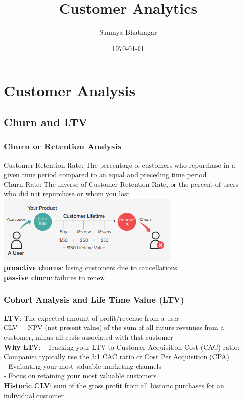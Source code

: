 \documentclass{beamer}
\title[DBMS]{Customer Analytics} %
\author{Saumya Bhatnagar} %
\date{\today} %
\begin{document}
\begin{frame}
\titlepage %
\end{frame}





\section{Customer Analysis}
\subsection{Churn and LTV}

\begin{frame}\frametitle{Churn or Retention Analysis}
Customer Retention Rate: The percentage of customers who repurchase in a given time period compared to an equal and preceding time period\\
Churn Rate: The inverse of Customer Retention Rate, or the percent of users who did not repurchase or whom you lost\\

\includegraphics[scale=0.5]{churn}\\
\textbf{proactive churns}: losing customers due to cancellations\\ \textbf{passive churn}: failures to renew\\
\end{frame}


\begin{frame}\frametitle{Cohort Analysis and Life Time Value (LTV)}
\textbf{LTV}: The expected amount of profit/revenue from a user\\
CLV = NPV (net present value) of the sum of all future revenues from a customer, minus all costs associated with that customer\\
\textbf{Why LTV}:
- Tracking your LTV to Customer Acquisition Cost (CAC) ratio: Companies typically use the 3:1 CAC ratio or Cost Per Acquisition (CPA)\\
- Evaluating your most valuable marketing channels\\
- Focus on retaining your most valuable customers\\
\textbf{Historic CLV}: sum of the gross profit from all historic purchases for an individual customer


\end{frame}
\end{document}
